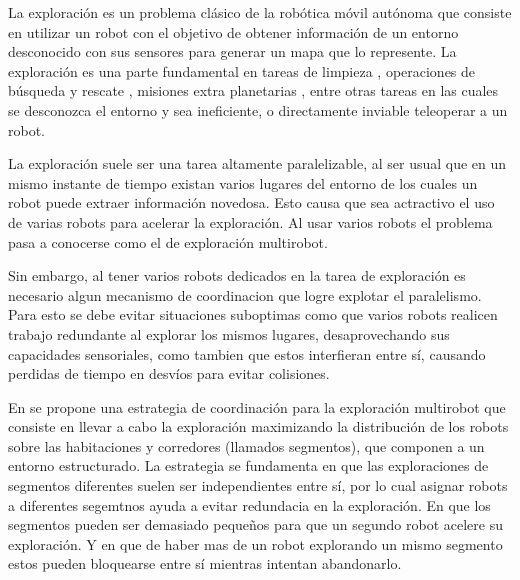 La exploración es un problema clásico de la robótica móvil autónoma que
consiste en utilizar un robot con el objetivo de obtener información de un
entorno desconocido con sus sensores para generar un mapa que lo represente. La
exploración es una parte fundamental en tareas de limpieza \cite{luo2002real},
operaciones de búsqueda y rescate \cite{Liu2015}, misiones extra planetarias
\cite{schuster2019towards}, entre otras tareas en las cuales se desconozca el
entorno y sea ineficiente, o directamente inviable teleoperar a un robot.

La exploración suele ser una tarea altamente paralelizable, al ser usual que en
un mismo instante de tiempo existan varios lugares del entorno de los cuales un
robot puede extraer información novedosa. Esto causa que sea actractivo el uso
de varias robots para acelerar la exploración. Al usar varios robots el
problema pasa a conocerse como el de exploración multirobot.

Sin embargo, al tener varios robots dedicados en la tarea de exploración es
necesario algun mecanismo de coordinacion que logre explotar el paralelismo.
Para esto se debe evitar situaciones suboptimas como que varios robots realicen
trabajo redundante al explorar los mismos lugares, desaprovechando sus
capacidades sensoriales, como tambien que estos interfieran entre sí, causando
perdidas de tiempo en desvíos para evitar colisiones.

En \cite{wurm2008coordinated} se propone una estrategia de coordinación para la
exploración multirobot que consiste en llevar a cabo la exploración maximizando
la distribución de los robots sobre las habitaciones y corredores (llamados
segmentos), que componen a un entorno estructurado. La estrategia se fundamenta
en que las exploraciones de segmentos diferentes suelen ser independientes
entre sí, por lo cual asignar robots a diferentes segemtnos ayuda a evitar
redundacia en la exploración. En que los segmentos pueden ser demasiado
pequeños para que un segundo robot acelere su exploración. Y en que de haber
mas de un robot explorando un mismo segmento estos pueden bloquearse entre sí
mientras intentan abandonarlo.


